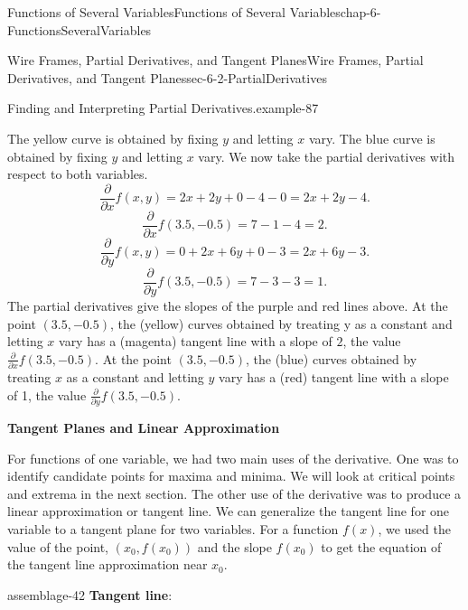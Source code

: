 \documentclass[oneside,10pt,]{book}
\newcommand{\terminology}[1]{\textbf{#1}}
\numberwithin{equation}{section}
\begin{document}
\begin{chapterptx}{Functions of Several Variables}{}{Functions of Several Variables}{}{}{chap-6-FunctionsSeveralVariables}
\begin{sectionptx}{Wire Frames, Partial Derivatives, and Tangent Planes}{}{Wire Frames, Partial Derivatives, and Tangent Planes}{}{}{sec-6-2-PartialDerivatives}
\begin{example}{Finding and Interpreting Partial Derivatives.}{example-87}
\begin{sidebyside}{1}{0.3}{0.3}{0}
\begin{sbspanel}{0.4}
\end{sbspanel}%
\end{sidebyside}%
\par
\hypertarget{p-2222}{}%
The yellow curve is obtained by fixing \(y\) and letting \(x\) vary.  The blue curve is obtained by fixing \(y\) and letting \(x\) vary.  We now take the partial derivatives with respect to both variables.%
%
\begin{equation*}
\frac{\partial }{\partial x} f(x,y)=2x+ 2y+0-4-0=2x+2y-4.
\end{equation*}
%
\begin{equation*}
\frac{\partial }{\partial x} f(3.5,-0.5)=7- 1-4=2.
\end{equation*}
%
\begin{equation*}
\frac{\partial }{\partial y} f(x,y)=0+2x+6y+0-3=2x+6y-3.
\end{equation*}
%
\begin{equation*}
\frac{\partial }{\partial y} f(3.5,-0.5)=7-3-3=1.
\end{equation*}
\hypertarget{p-2223}{}%
The partial derivatives give the slopes of the purple and red lines above.  At the point \((3.5,-0.5)\), the (yellow) curves obtained by treating y as a constant and letting \(x\) vary has a (magenta) tangent line with a slope of \(2\), the value \(\frac{\partial }{\partial x} f(3.5,-0.5)\).   At the point \((3.5,-0.5)\), the (blue) curves obtained by treating \(x\) as a constant and letting \(y\) vary has a (red) tangent line with a slope of 1, the value \(\frac{\partial }{\partial y} f(3.5,-0.5)\).%
\end{example}
\hypertarget{p-2224}{}%
\terminology{Tangent Planes and Linear Approximation}%
\par
\hypertarget{p-2225}{}%
For functions of one variable, we had two main uses of the derivative.  One was to identify candidate points for maxima and minima.  We will look at critical points and extrema in the next section.  The other use of the derivative was to produce a linear approximation or tangent line.  We can generalize the tangent line for one variable to a tangent plane for two variables.  For a function \(f(x)\), we used the value of the point, \((x_0,f(x_0))\) and the slope \(f(x_0)\) to get the equation of the tangent line approximation near \(x_0\).%
\begin{assemblage}{}{assemblage-42}%
\hypertarget{p-2226}{}%
\terminology{Tangent line}:%
\par
\hypertarget{p-2227}{}%
%
\begin{equation*}

\end{equation*}
\end{assemblage}
\end{sectionptx}
\end{chapterptx}
\end{document}
